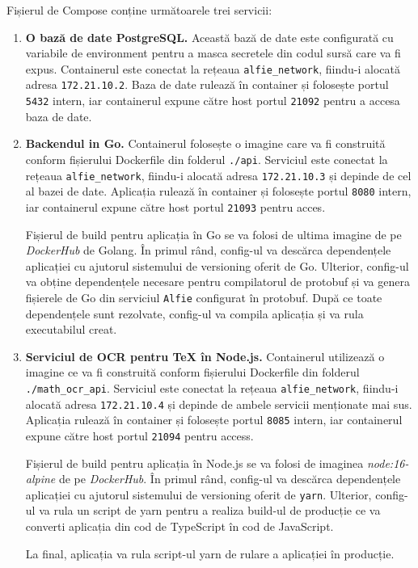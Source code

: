 Fișierul de Compose conține următoarele trei servicii:
\begin{enumerate}
    \item \textbf{O bază de date PostgreSQL.} Această bază de date este configurată cu variabile de environment pentru a masca secretele din codul sursă care va fi expus. Containerul este conectat la rețeaua \texttt{alfie_network}, fiindu-i alocată adresa \texttt{172.21.10.2}. Baza de date rulează în container și folosește portul \texttt{5432} intern, iar containerul expune către host portul \texttt{21092} pentru a accesa baza de date.

    \item \textbf{Backendul in Go.} Containerul folosește o imagine care va fi construită conform fișierului Dockerfile din folderul \texttt{./api}. Serviciul este conectat la rețeaua \texttt{alfie_network}, fiindu-i alocată adresa \texttt{172.21.10.3} și depinde de cel al bazei de date. Aplicația rulează în container și folosește portul \texttt{8080} intern, iar containerul expune către host portul \texttt{21093} pentru acces.

    Fișierul de build pentru aplicația în Go se va folosi de ultima imagine de pe \textit{DockerHub} de Golang. În primul rând, config-ul va descărca dependențele aplicației cu ajutorul sistemului de versioning oferit de Go. Ulterior, config-ul va obține dependențele necesare pentru compilatorul de protobuf și va genera fișierele de Go din serviciul \texttt{Alfie} configurat în protobuf. După ce toate dependențele sunt rezolvate, config-ul va compila aplicația și va rula executabilul creat.
    
    \item \textbf{Serviciul de OCR pentru TeX în Node.js.} Containerul utilizează o imagine ce va fi construită conform fișierului Dockerfile din folderul \texttt{./math_ocr_api}. Serviciul este conectat la rețeaua \texttt{alfie_network}, fiindu-i alocată adresa \texttt{172.21.10.4} și depinde de ambele servicii menționate mai sus. Aplicația rulează în container și folosește portul \texttt{8085} intern, iar containerul expune către host portul \texttt{21094} pentru access.
    
    Fișierul de build pentru aplicația în Node.js se va folosi de imaginea \textit{node:16-alpine} de pe \textit{DockerHub}. În primul rând, config-ul va descărca dependențele aplicației cu ajutorul sistemului de versioning oferit de \texttt{yarn}. Ulterior, config-ul va rula un script de yarn pentru a realiza build-ul de producție ce va converti aplicația din cod de TypeScript în cod de JavaScript.
    
    La final, aplicația va rula script-ul yarn de rulare a aplicației în producție.
\end{enumerate}

